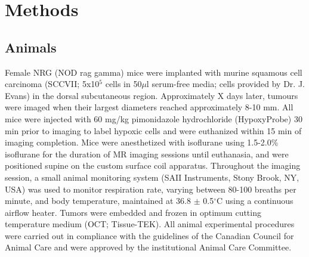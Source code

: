 \section{Methods}
\subsection{Animals}
Female NRG (NOD rag gamma) mice were implanted with murine squamous cell carcinoma (SCCVII; 5x10$^5$ cells in 50$\mu$l serum-free media; cells provided by Dr. J. Evans) in the dorsal subcutaneous region.
Approximately X  days later, tumours were imaged when their largest diameters reached approximately 8-10 mm.
All mice were injected with 60 mg/kg pimonidazole hydrochloride (HypoxyProbe) 30 min prior to imaging to label hypoxic cells and were euthanized within 15 min of imaging completion.
Mice were anesthetized with isoflurane using 1.5-2.0\% isoflurane for the duration of MR imaging sessions until euthanasia, and were positioned supine on the custom surface coil apparatus.
Throughout the imaging session, a small animal monitoring system (SAII Instruments, Stony Brook, NY, USA) was used to monitor respiration rate, varying between 80-100 breaths per minute, and body temperature, maintained at 36.8 $\pm$ 0.5$^\circ$C using a continuous airflow heater. 
Tumors were embedded and frozen in optimum cutting temperature medium (OCT; Tissue-TEK).
All animal experimental procedures were carried out in compliance with the guidelines of the Canadian Council for Animal Care and were approved by the institutional Animal Care Committee.

